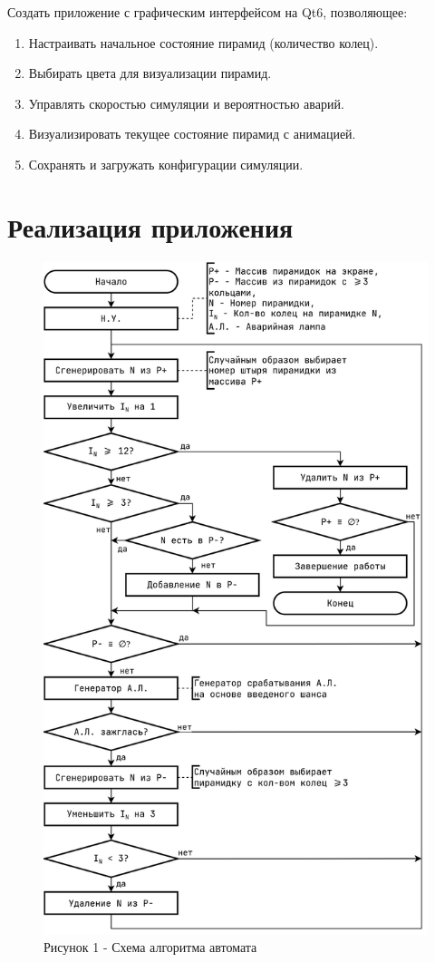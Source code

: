 \documentclass[oneside,a4paper,14pt]{extarticle}
\begin{document}
\noindent Создать приложение с графическим интерфейсом на Qt6, позволяющее:
\begin{enumerate}
  \item Настраивать начальное состояние пирамид (количество колец).
  \item Выбирать цвета для визуализации пирамид.
  \item Управлять скоростью симуляции и вероятностью аварий.
  \item Визуализировать текущее состояние пирамид с анимацией.
  \item Сохранять и загружать конфигурации симуляции.
\end{enumerate}

\section*{Реализация приложения}

\begin{figure}[H]
  \centering
  \includegraphics[height=0.9\textheight]{pics/flowchart.png}
  \caption*{Рисунок 1 - Схема алгоритма автомата}
\end{figure}
\end{document}
